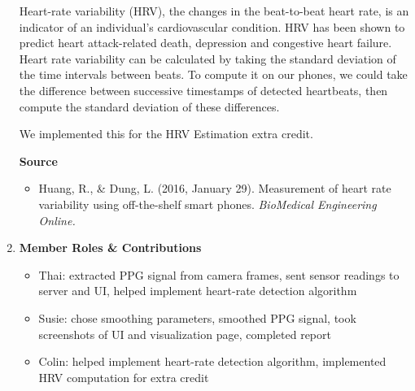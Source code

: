 \documentclass[12pt]{article}
\begin{document}
\begin{enumerate}
\vspace{4mm}
Heart-rate variability (HRV), the changes in the beat-to-beat heart rate, is an indicator of an individual's cardiovascular condition. HRV has been shown to predict heart attack-related death, depression and congestive heart failure. Heart rate variability can be calculated by taking the standard deviation of the time intervals between beats. To compute it on our phones, we could take the difference between successive timestamps of detected heartbeats, then compute the standard deviation of these differences. 

\vspace{4mm}
We implemented this for the HRV Estimation extra credit.

\vspace{6mm}
\textbf{Source}
\begin{itemize}
\item Huang, R., \& Dung, L. (2016, January 29). Measurement of heart rate variability using off-the-shelf smart phones. \textit{BioMedical Engineering Online.}
\end{itemize}


\vspace{12mm}

\item \textbf{Member Roles \& Contributions}
\begin{itemize}
\item Thai: extracted PPG signal from camera frames, sent sensor readings to server and UI, helped implement heart-rate detection algorithm
\item Susie: chose smoothing parameters, smoothed PPG signal, took screenshots of UI and visualization page, completed report
\item Colin: helped implement heart-rate detection algorithm, implemented HRV \newline computation for extra credit
\end{itemize}




\end{enumerate}

 
\end{document}
